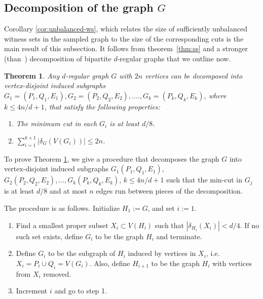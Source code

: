 \documentclass[11pt]{article}
\newtheorem{theorem}{Theorem}[section]
\begin{document}
 
\subsection{Decomposition of the graph $G$} \label{subsec:decomp}
Corollary \ref{cor:unbalanced-ws}, which relates
the size of sufficiently unbalanced witness sets in the sampled graph to the
size of the corresponding cuts is the main result of this subsection. It follows from theorem~\ref{thm:ss} and a stronger
(than~\cite{gkk:rbp08}) decomposition of bipartite $d$-regular graphs that we outline now.
\begin{theorem} \label{thm:decomposition}
Any $d$-regular graph $G$ with $2n$ vertices can be decomposed into
 vertex-disjoint induced subgraphs $G_1=(P_1,Q_1,E_1), G_2 = (P_2,Q_2,E_2), ...., G_k =(P_k,Q_k,E_k)$, where $k\leq 4n/d+1$, that satisfy the following properties:

\begin{enumerate}
 \item The minimum cut in each $G_i$ is at least $d/8$.



 \item $\sum_{i=1}^{k+1}  | \delta_G (V(G_i)) | \leq 2n$.
\end{enumerate}
\end{theorem}

To prove Theorem \ref{thm:decomposition}, we give a procedure that decomposes the graph $G$ into vertex-disjoint induced subgraphs $G_1(P_1, Q_1, E_1)$, $G_2(P_2, Q_2, E_2),\ldots, G_k(P_k, Q_k, E_k)$, $k\leq 4n/d+1$ such that the min-cut in $G_j$ is at least $d/8$ and at most $n$ edges run between pieces of the decomposition. 


The procedure is as follows. Initialize $H_1:=G$, and set $i:=1$.
\begin{enumerate}
\item Find a smallest proper subset $X_i\subset V(H_i)$ such that $|\delta_{H_i}(X_i)|< d/4$. If no such set exists, define $G_i$ to be the graph $H_i$ and terminate. 
\item Define $G_i$ to be the subgraph of $H_i$ induced by vertices in $X_i$, i.e. $X_i=P_i\cup Q_i=V(G_i)$. Also, define $H_{i+1}$ to be the graph $H_i$ with vertices from $X_i$ removed.
\item Increment $i$ and go to step 1.	
\end{enumerate}
\end{document}

